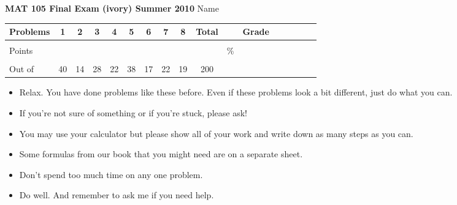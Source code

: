 \documentclass[12pt]{article}
\begin{document}
{\bf MAT 105 Final Exam (ivory) Summer 2010} \hspace{.4in} {\large Name} \hrulefill

\hspace{.2in}

\begin{center}

\begin{tabular}
{|l|c|c|c|c|c|c|c|c|c|c|c|c|c|c|c|c|} \hline

 Problems & \hspace{5 pt} 1 \hspace{5 pt}  & \hspace{5 pt} 2 \hspace{5 pt} & \hspace{5 pt} 3 \hspace{5 pt} & \hspace{5 pt} 4 \hspace{5 pt}& \hspace{5 pt} 5 \hspace{5 pt} & \hspace{5 pt} 6 \hspace{5 pt} & \hspace{5 pt} 7 \hspace{5 pt}   & \hspace{5 pt} 8 \hspace{5 pt} &  \hspace{5 pt} Total  \hspace{5 pt} & &  \hspace{5 pt} Grade \hspace{5 pt}  \\ \hline
&&&&&&&&&&&\\  
Points &&&&&&&&&&   \hspace{.6in}\% &  \\ 
&&&&&&&&&&& \\  \hline
Out of & 40  & 14 & 28 & 22 & 38 & 17 & 22 & 19 &200 & & \\ \hline

\end {tabular}
 
\end{center}

\hspace{.2in}

\begin{itemize}
\item Relax.  You have done problems like these before. Even if these problems look a bit different, just do what you can. 
\item  If you're not sure of something or if you're stuck, please ask! 
\item You may use your calculator but please show all of your work and write down as many steps as you can.  
\item Some formulas from our book that you might need are on a separate sheet.
\item Don't spend too much time on any one problem.
\item  Do well.  And remember to ask me if you need help.
\end{itemize}
\end{document}
